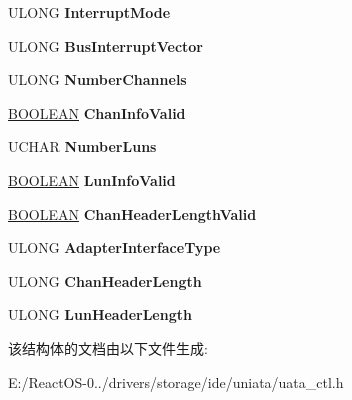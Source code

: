 \begin{DoxyCompactItemize}
U\+L\+O\+NG {\bfseries Interrupt\+Mode}
\item 
\mbox{\label{struct___a_d_a_p_t_e_r_i_n_f_o_afd74f92e3882b6b0e2dfc1e0e9b49065}} 
U\+L\+O\+NG {\bfseries Bus\+Interrupt\+Vector}
\item 
\mbox{\label{struct___a_d_a_p_t_e_r_i_n_f_o_a41bd39a19519bb5a8b8f2a57819fad9e}} 
U\+L\+O\+NG {\bfseries Number\+Channels}
\item 
\mbox{\label{struct___a_d_a_p_t_e_r_i_n_f_o_a8be6b2aaf51f32e7df506fdfa0f382bb}} 
\hyperlink{_processor_bind_8h_a112e3146cb38b6ee95e64d85842e380a}{B\+O\+O\+L\+E\+AN} {\bfseries Chan\+Info\+Valid}
\item 
\mbox{\label{struct___a_d_a_p_t_e_r_i_n_f_o_a3ff25dde2f8e5934ac6eaf15067bf05f}} 
U\+C\+H\+AR {\bfseries Number\+Luns}
\item 
\mbox{\label{struct___a_d_a_p_t_e_r_i_n_f_o_ac1b8f5c3e56034678573886dd81d5edd}} 
\hyperlink{_processor_bind_8h_a112e3146cb38b6ee95e64d85842e380a}{B\+O\+O\+L\+E\+AN} {\bfseries Lun\+Info\+Valid}
\item 
\mbox{\label{struct___a_d_a_p_t_e_r_i_n_f_o_a324f41304ab38f7f49f180c4289e3e44}} 
\hyperlink{_processor_bind_8h_a112e3146cb38b6ee95e64d85842e380a}{B\+O\+O\+L\+E\+AN} {\bfseries Chan\+Header\+Length\+Valid}
\item 
\mbox{\label{struct___a_d_a_p_t_e_r_i_n_f_o_ade6561f2f79d6705b210ebd9da7f8091}} 
U\+L\+O\+NG {\bfseries Adapter\+Interface\+Type}
\item 
\mbox{\label{struct___a_d_a_p_t_e_r_i_n_f_o_a411810f4f794be9e8e98006d59beb665}} 
U\+L\+O\+NG {\bfseries Chan\+Header\+Length}
\item 
\mbox{\label{struct___a_d_a_p_t_e_r_i_n_f_o_a34bac58987cdc81a0f43c072c4c36100}} 
U\+L\+O\+NG {\bfseries Lun\+Header\+Length}
\end{DoxyCompactItemize}


该结构体的文档由以下文件生成\+:\begin{DoxyCompactItemize}
\item 
E\+:/\+React\+O\+S-\/0../drivers/storage/ide/uniata/uata\+\_\+ctl.\+h\end{DoxyCompactItemize}

